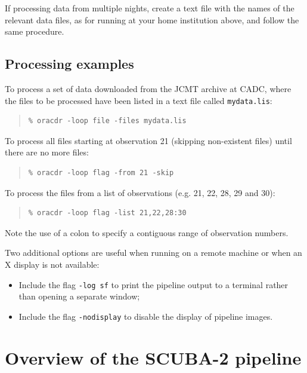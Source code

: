 \documentclass[twoside,11pt]{article}
\newcommand{\xlabel}[1]{}
\renewcommand{\_}{\texttt{\symbol{95}}}
\newenvironment{myquote}{\begin{quote}\begin{small}}{\end{small}\end{quote}}
\begin{document}
If processing data from multiple nights, create a text file with the
names of the relevant data files, as for running at your home
institution above, and follow the same procedure.

\subsection{Processing examples\label{sse:examples}}

To process a set of data downloaded from the JCMT archive at CADC,
where the files to be processed have been listed in a text file called
\verb+mydata.lis+:
\begin{myquote}
\begin{verbatim}
% oracdr -loop file -files mydata.lis
\end{verbatim}
\end{myquote}

To process all files starting at observation 21 (skipping non-existent
files) until there are no more files:
\begin{myquote}
\begin{verbatim}
% oracdr -loop flag -from 21 -skip
\end{verbatim}
\end{myquote}

To process the files from a list of observations (e.g. 21, 22, 28, 29 and
30):
\begin{myquote}
\begin{verbatim}
% oracdr -loop flag -list 21,22,28:30
\end{verbatim}
\end{myquote}
Note the use of a colon to specify a contiguous range of observation
numbers.

Two additional options are useful when running on a remote machine or
when an X display is not available:
\begin{itemize}
\item Include the flag \verb+-log sf+ to print the pipeline output to
  a terminal rather than opening a separate window;
\item Include the flag \verb+-nodisplay+ to disable the display of
  pipeline images.
\end{itemize}

\section{\xlabel{overview}Overview of the SCUBA-2 pipeline\label{se:overview}}
\end{document}

